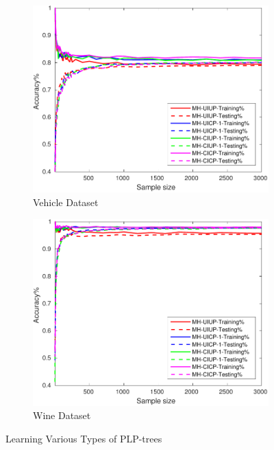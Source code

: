 \begin{figure}[ht]
\begin{subfigure}[b]{0.3\textwidth}
  	\includegraphics[width=\textwidth]{figs/PLPTF/Trees/VehicleDownsampledFurther_Trees_MH.pdf}
  	\caption{Vehicle Dataset}
		\label{fig:V2}
	\end{subfigure}
  \begin{subfigure}[b]{0.3\textwidth}
		\centering
  	\includegraphics[width=\textwidth]{figs/PLPTF/Trees/WineDownsampled_Trees_MH.pdf}
  	\caption{Wine Dataset}
		\label{fig:W2}
	\end{subfigure}

  \caption{Learning Various Types of PLP-trees}
  \label{fig:trees2}
\end{figure}

